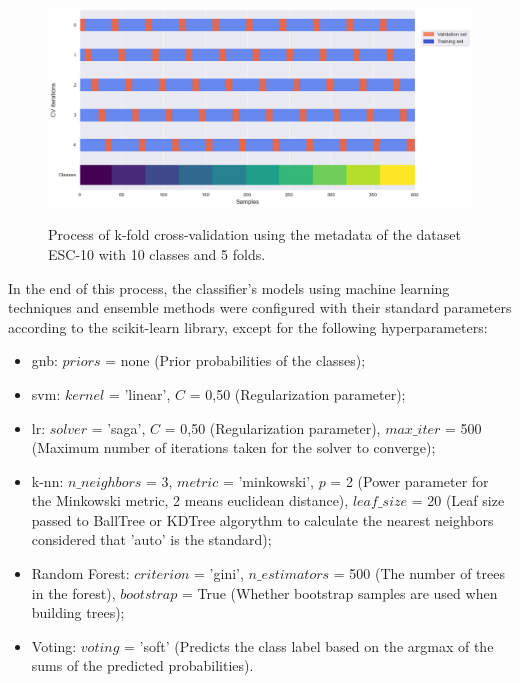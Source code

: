 \begin{figure}[htbp]
    \raggedright
        \caption{Process of k-fold cross-validation using the metadata of the dataset ESC-10 with 10 classes and 5 folds.}
        \includegraphics[width=1\textwidth]{resources/images/050-methods/Methods_training_k-fold.png}
        \label{fig:methods_training_k-fold}
\end{figure}

In the end of this process, the classifier's models using machine learning techniques and ensemble methods were configured with their standard parameters according to the scikit-learn library, except for the following hyperparameters:

\begin{itemize}
    \item \gls{gnb}: $ priors$ = none (Prior probabilities of the classes);
    \item \gls{svm}: $kernel$ = 'linear', $C$ = 0,50 (Regularization parameter);
    \item \gls{lr}: $solver$ = 'saga', $C$ = 0,50 (Regularization parameter), $max\_iter$ = 500 (Maximum number of iterations taken for the solver to converge);
    \item \gls{k-nn}: $n\_neighbors$ = 3, $metric$ = 'minkowski', $p$ = 2 (Power parameter for the Minkowski metric, 2 means euclidean distance), $leaf\_size$ = 20 (Leaf size passed to BallTree or KDTree algorythm to calculate the nearest neighbors considered that 'auto' is the standard);
    \item Random Forest: $criterion$ = 'gini', $n\_estimators$ = 500 (The number of trees in the forest), $bootstrap$ = True (Whether bootstrap samples are used when building trees);
    \item Voting: $voting$ = 'soft' (Predicts the class label based on the argmax of the sums of the predicted probabilities).
\end{itemize}

